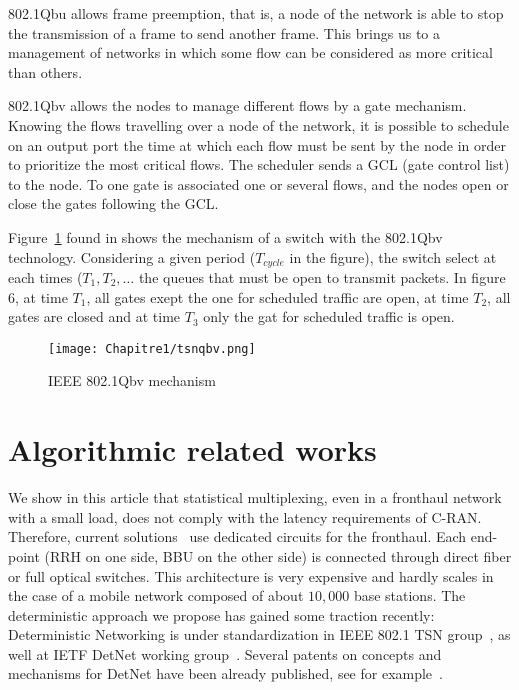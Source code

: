 802.1Qbu allows frame preemption, that is, a node of the network is able to stop the transmission of a frame to send another frame. This brings us to a management of networks in which some flow can be considered as more critical than others. 


802.1Qbv allows the nodes to manage different flows by a gate mechanism. Knowing the flows travelling over a node of the network, it is possible to schedule on an output port the time at which each flow must be sent by the node in order to prioritize the most critical flows. The scheduler sends a  GCL (gate control list) to the node. To one gate is associated one or several flows, and the nodes open or close the gates following the GCL.

Figure~\ref{fig:tsnqbv} found in \cite{durr2016no} shows the mechanism of a switch with the 802.1Qbv technology. Considering a given period ($T_{cycle}$ in the figure), the switch select at each times ($T_1 , T_2 , \ldots$ the queues that must be open to transmit packets. In figure 6, at time $T_1$, all gates exept the one for scheduled traffic are open, at time $T_2$, all gates are closed and at time $T_3$ only the gat for scheduled traffic is open.
  \begin{figure}[h]
      \begin{center}
      \texttt{[image: Chapitre1/tsnqbv.png]}
      \end{center}
      \caption{IEEE 802.1Qbv mechanism}\label{fig:tsnqbv}
      \end{figure}
      
   
\section{Algorithmic related works}

  We show in this article that statistical multiplexing, even in a fronthaul network with a small load, does not comply with the latency requirements of C-RAN. Therefore, current solutions~\cite{pizzinat2015things,tayq2017real}  use dedicated circuits for the fronthaul. Each end-point (RRH on one side, BBU on the other side) is connected through direct fiber or full optical switches. This architecture is very expensive and hardly scales in the case of a mobile network composed of about $10,000$ base stations. The deterministic approach we propose has gained some traction recently: Deterministic Networking is under standardization in IEEE 802.1 TSN group~\cite{finn-detnet-architecture-08}, as well at IETF DetNet working group~\cite{ieee802}. Several patents on concepts and mechanisms for DetNet have been already published, see for example~\cite{howe2005time,leclerc2016transmission}. 
     
